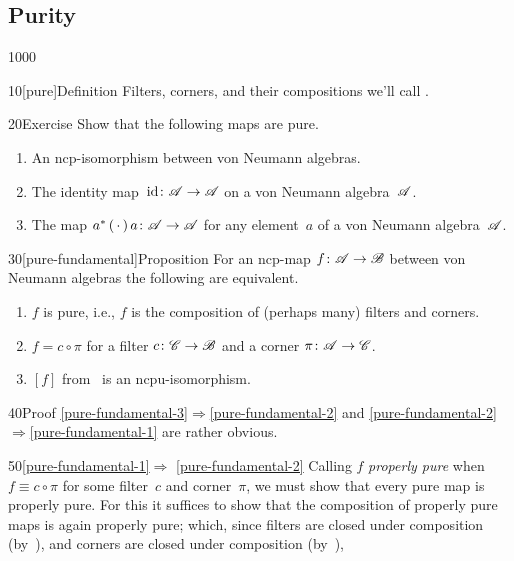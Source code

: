 \subsection{Purity}
\begin{parsec}{1000}%
\begin{point}{10}[pure]{Definition}%
Filters, corners,
and their compositions we'll call .%
\end{point}
\begin{point}{20}{Exercise}%
Show that the following maps are pure.
\begin{enumerate}%
\item
An ncp-isomorphism between von Neumann algebras.
\item
The identity map~$\mathrm{id}\colon \mathscr{A}\to\mathscr{A}$
on a von Neumann algebra~$\mathscr{A}$.
\item
The map $a^*\,(\,\cdot\,)\,a\colon \mathscr{A}\to\mathscr{A}$
for any element~$a$ of a von Neumann algebra~$\mathscr{A}$.
\end{enumerate}
\spacingfix%
\end{point}%
\begin{point}{30}[pure-fundamental]{Proposition}%
For an ncp-map $f\colon \mathscr{A}\to\mathscr{B}$ between von Neumann algebras
the following are equivalent.
\begin{enumerate}
\item 
\label{pure-fundamental-1}
	$f$ is pure, i.e., $f$ is the composition
	of (perhaps many) filters and corners.
\item
\label{pure-fundamental-2}
	$f = c\circ \pi$ for a filter $c\colon \mathscr{C}\to\mathscr{B}$
	and a corner $\pi\colon \mathscr{A}\to\mathscr{C}$.
\item
\label{pure-fundamental-3}
	$[f]$ from~ is an ncpu-isomorphism.
\end{enumerate}
\spacingfix%
\begin{point}{40}{Proof}%
\ref{pure-fundamental-3}$\Longrightarrow$\ref{pure-fundamental-2}
and \ref{pure-fundamental-2}$\Longrightarrow$\ref{pure-fundamental-1}
are rather obvious.
\begin{point}{50}{\ref{pure-fundamental-1}$\Longrightarrow$%
\ref{pure-fundamental-2}}%
Calling $f$ \emph{properly pure}
when~$f\equiv c\circ \pi$
for some filter~$c$ and corner~$\pi$,
we must show that every pure map is properly pure.
For this it suffices to show that the composition of properly
pure maps is again properly pure;
which,
since filters are closed under composition
(by~),
and corners are closed under composition
(by~),

\end{point}
\end{point}
\end{point}
\end{parsec}
